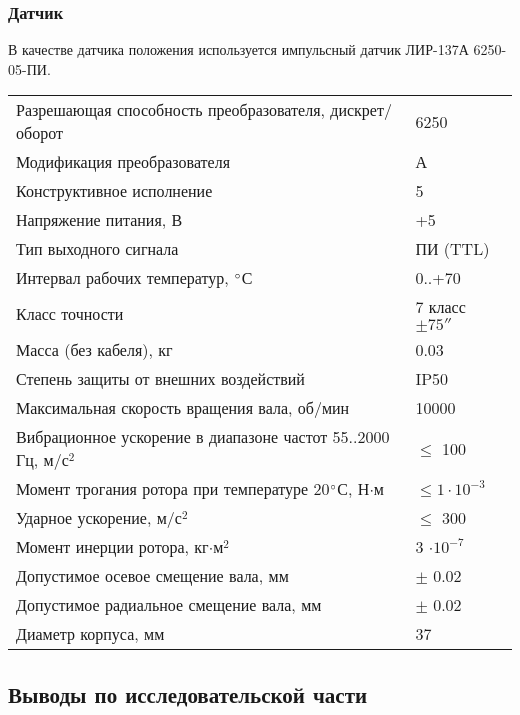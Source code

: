 \subsubsection{Датчик}
В качестве датчика положения используется импульсный датчик ЛИР-137А 6250-05-ПИ.

\begin{table}
    \centering
    \begin{tabular}{l|l}
    \hline
        Разрешающая способность преобразователя, дискрет/оборот         & 6250 \\
        Модификация преобразователя                                     & А \\
        Конструктивное исполнение                                       & 5 \\
        Напряжение питания, В                                           & +5 \\
        Тип выходного сигнала                                           & ПИ (TTL) \\
        Интервал рабочих температур, $\degree$С                         & 0..+70 \\
        Класс точности                                                  & 7 класс $\pm75''$ \\
        Масса (без кабеля), кг                                          & 0.03 \\
        Степень защиты от внешних воздействий                           & IP50 \\
        Максимальная скорость вращения вала, об/мин                     & 10000 \\
        Вибрационное ускорение в диапазоне частот 55..2000 Гц, м/с$^2$  & $\leq$ 100 \\
        Момент трогания ротора при температуре 20$\degree$С, Н$\cdot$м  & $\leq 1 \cdot 10^{-3}$ \\
        Ударное ускорение, м/с$^2$                                      & $\leq$ 300 \\
        Момент инерции ротора, кг$\cdot$м$^2$                           & 3 $\cdot 10^{-7}$ \\
        Допустимое осевое смещение вала, мм                             & $\pm$ 0.02 \\
        Допустимое радиальное смещение вала, мм                         & $\pm$ 0.02 \\
        Диаметр корпуса, мм                                             & 37 \\
    \hline
    \end{tabular}
    \label{encoder_params}
\end{table}

\newpage


\newpage


\newpage
\subsection{Выводы по исследовательской части}
